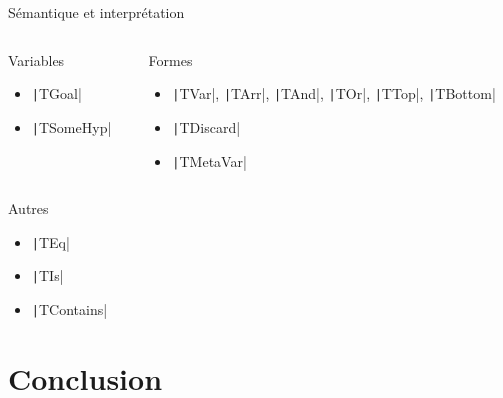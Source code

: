 \documentclass[french,usepdftitle=false,compress]{beamer}
\begin{document}
\begin{frame}{Sémantique et interprétation}
  \begin{columns}
    \begin{column}{0.5\textwidth}
      \begin{block}{Variables}
        \begin{itemize}
          \item \texttt|TGoal|
          \item \texttt|TSomeHyp|
        \end{itemize}
      \end{block}
    \end{column}

    \begin{column}{0.5\textwidth}
      \begin{block}{Formes}
        \begin{itemize}
          \item \texttt|TVar|, \texttt|TArr|, \texttt|TAnd|, \texttt|TOr|, \texttt|TTop|, \texttt|TBottom|
          \item \texttt|TDiscard|
          \item \texttt|TMetaVar|
        \end{itemize}
      \end{block}
    \end{column}
  \end{columns}

  \begin{block}{Autres}
    \begin{itemize}
      \item \texttt|TEq|
      \item \texttt|TIs|
      \item \texttt|TContains|
    \end{itemize}
  \end{block}
\end{frame}

\section{Conclusion}
\end{document}
